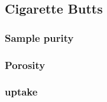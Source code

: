 \subsection{Cigarette Butts}
\label{ss:cigarette_butts}

\subsubsection{Sample purity}

\subsubsection{Porosity}

\subsubsection{ uptake}